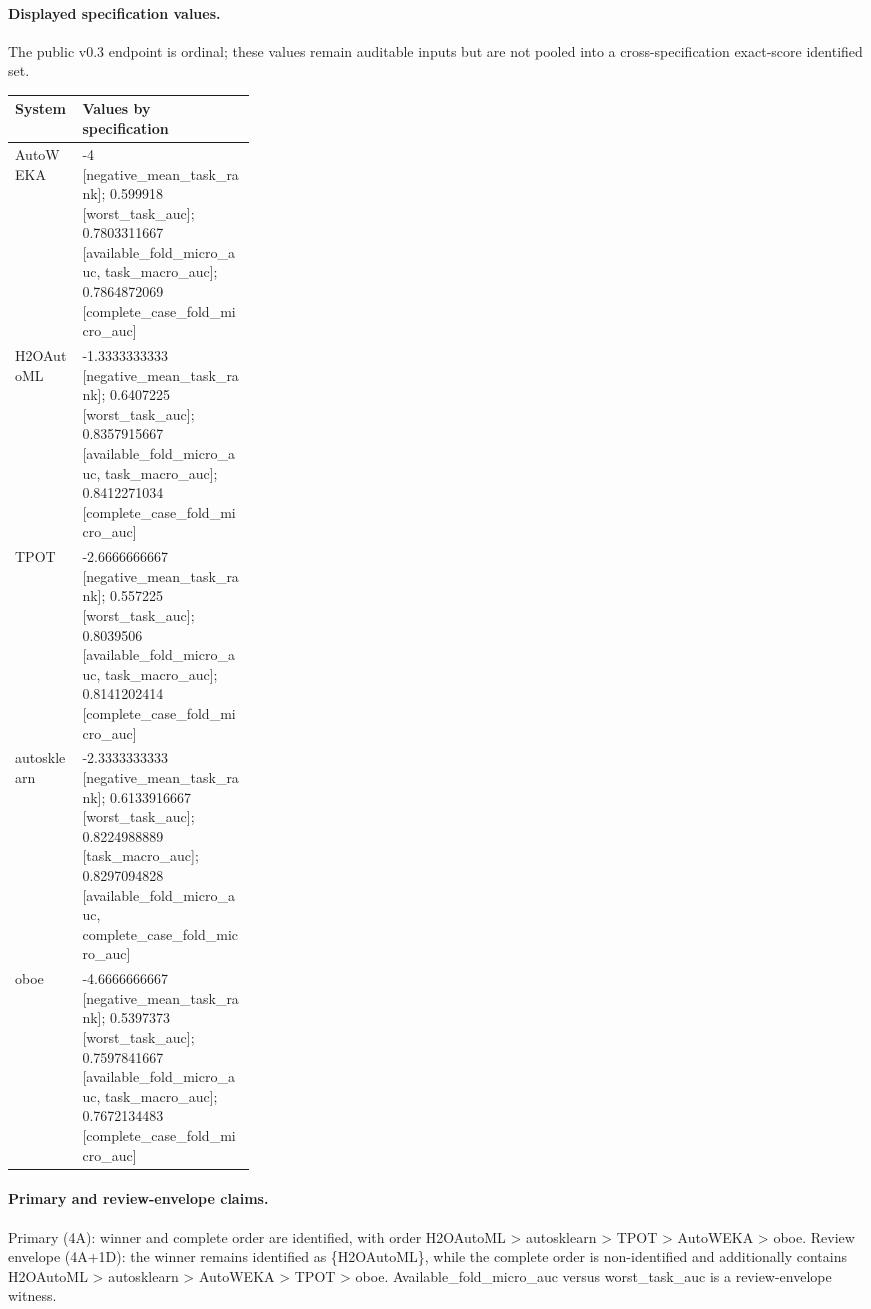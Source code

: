 \paragraph{Displayed specification values.} The public v0.3 endpoint is ordinal; these values remain auditable inputs but are not pooled into a cross-specification exact-score identified set.
\begingroup\scriptsize
\begin{tabularx}{\linewidth}{@{}p{0.28\linewidth}X@{}}
\toprule System & Values by specification \\
\midrule
AutoWEKA & -4 [negative\_mean\_task\_rank]; 0.599918 [worst\_task\_auc]; 0.7803311667 [available\_fold\_micro\_auc, task\_macro\_auc]; 0.7864872069 [complete\_case\_fold\_micro\_auc] \\
H2OAutoML & -1.3333333333 [negative\_mean\_task\_rank]; 0.6407225 [worst\_task\_auc]; 0.8357915667 [available\_fold\_micro\_auc, task\_macro\_auc]; 0.8412271034 [complete\_case\_fold\_micro\_auc] \\
TPOT & -2.6666666667 [negative\_mean\_task\_rank]; 0.557225 [worst\_task\_auc]; 0.8039506 [available\_fold\_micro\_auc, task\_macro\_auc]; 0.8141202414 [complete\_case\_fold\_micro\_auc] \\
autosklearn & -2.3333333333 [negative\_mean\_task\_rank]; 0.6133916667 [worst\_task\_auc]; 0.8224988889 [task\_macro\_auc]; 0.8297094828 [available\_fold\_micro\_auc, complete\_case\_fold\_micro\_auc] \\
oboe & -4.6666666667 [negative\_mean\_task\_rank]; 0.5397373 [worst\_task\_auc]; 0.7597841667 [available\_fold\_micro\_auc, task\_macro\_auc]; 0.7672134483 [complete\_case\_fold\_micro\_auc] \\
\bottomrule\end{tabularx}\endgroup

\paragraph{Primary and review-envelope claims.} Primary (4A): winner and complete order are identified, with order H2OAutoML  >  autosklearn  >  TPOT  >  AutoWEKA  >  oboe.  Review envelope (4A+1D): the winner remains identified as \{H2OAutoML\}, while the complete order is non-identified and additionally contains H2OAutoML  >  autosklearn  >  AutoWEKA  >  TPOT  >  oboe.  Available\_fold\_micro\_auc versus worst\_task\_auc is a review-envelope witness.

